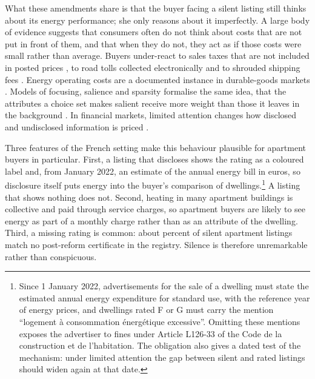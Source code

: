 What these amendments share is that the buyer facing a silent listing still thinks about its energy performance; she only reasons about it imperfectly. A large body of evidence suggests that consumers often do not think about costs that are not put in front of them, and that when they do not, they act as if those costs were small rather than average. Buyers under-react to sales taxes that are not included in posted prices \citep{chetty_salience_2009}, to road tolls collected electronically \citep{finkelstein_eztax_2009} and to shrouded shipping fees \citep{brown_shrouded_2010}. Energy operating costs are a documented instance in durable-goods markets \citep[e.g.,][]{allcott_consumers_2011, sallee_rational_2014, allcott_evaluating_2015}. Models of focusing, salience and sparsity formalise the same idea, that the attributes a choice set makes salient receive more weight than those it leaves in the background \citep[e.g.,][]{koszegi_model_2013, bordalo_salience_2013, gabaix_sparsity_2014}. In financial markets, limited attention changes how disclosed and undisclosed information is priced \citep[e.g.,][]{hirshleifer_limited_2003, dellavigna_investor_2009}.

Three features of the French setting make this behaviour plausible for apartment buyers in particular. First, a listing that discloses shows the rating as a coloured label and, from January 2022, an estimate of the annual energy bill in euros, so disclosure itself puts energy into the buyer's comparison of dwellings.\footnote{Since 1 January 2022, advertisements for the sale of a dwelling must state the estimated annual energy expenditure for standard use, with the reference year of energy prices, and dwellings rated F or G must carry the mention ``logement \`a consommation \'energ\'etique excessive''. Omitting these mentions exposes the advertiser to fines under Article L126-33 of the Code de la construction et de l'habitation. %
The obligation also gives a dated test of the mechanism: under limited attention the gap between silent and rated listings should widen again at that date.} A listing that shows nothing does not. Second, heating in many apartment buildings is collective and paid through service charges, so apartment buyers are likely to see energy as part of a monthly charge rather than as an attribute of the dwelling. Third, a missing rating is common: about \attShareUninfApt{} percent of silent apartment listings match no post-reform certificate in the registry. Silence is therefore unremarkable rather than conspicuous.


